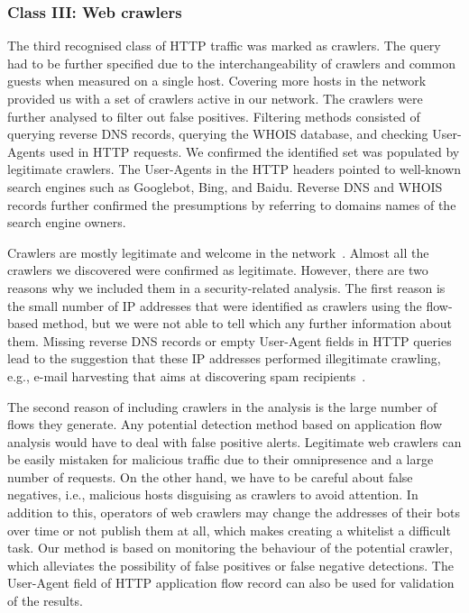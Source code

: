 \subsubsection{Class III: Web crawlers}

The third recognised class of HTTP traffic was marked as crawlers. The query had to be further specified due to the interchangeability of crawlers and common guests when measured on a single host. Covering more hosts in the network provided us with a set of crawlers active in our network. The crawlers were further analysed to filter out false positives. Filtering methods consisted of querying reverse DNS records, querying the WHOIS database, and checking User-Agents used in HTTP requests. We confirmed the identified set was populated by legitimate crawlers. The User-Agents in the HTTP headers pointed to well-known search engines such as Googlebot, Bing, and Baidu. Reverse DNS and WHOIS records further confirmed the presumptions by referring to domains names of the search engine owners.

Crawlers are mostly legitimate and welcome in the network~\cite{Sun-2010-Ethicality}. Almost all the crawlers we discovered were confirmed as legitimate. However, there are two reasons why we included them in a security-related analysis. The first reason is the small number of IP addresses that were identified as crawlers using the flow-based method, but we were not able to tell which any further information about them. Missing reverse DNS records or empty User-Agent fields in HTTP queries lead to the suggestion that these IP addresses performed illegitimate crawling, e.g., e-mail harvesting that aims at discovering spam recipients~\cite{Hohlfeld-2012-Longtime}.

The second reason of including crawlers in the analysis is the large number of flows they generate. Any potential detection method based on application flow analysis would have to deal with false positive alerts. Legitimate web crawlers can be easily mistaken for malicious traffic due to their omnipresence and a large number of requests. On the other hand, we have to be careful about false negatives, i.e., malicious hosts disguising as crawlers to avoid attention. In addition to this, operators of web crawlers may change the addresses of their bots over time or not publish them at all, which makes creating a whitelist a difficult task. Our method is based on monitoring the behaviour of the potential crawler, which alleviates the possibility of false positives or false negative detections. The User-Agent field of HTTP application flow record can also be used for validation of the results.


